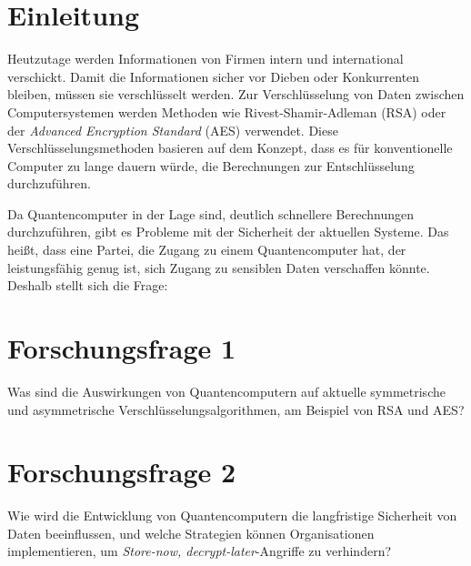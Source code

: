 \section{Einleitung}

Heutzutage werden Informationen von Firmen intern und international verschickt. 
Damit die Informationen sicher vor Dieben oder Konkurrenten bleiben, müssen sie verschlüsselt werden. 
Zur Verschlüsselung von Daten zwischen Computersystemen werden Methoden wie Rivest-Shamir-Adleman (RSA) oder der \textit{Advanced Encryption Standard} (AES) verwendet. 
Diese Verschlüsselungsmethoden basieren auf dem Konzept, dass es für konventionelle Computer zu lange dauern würde, die Berechnungen zur Entschlüsselung durchzuführen.

Da Quantencomputer in der Lage sind, deutlich schnellere Berechnungen durchzuführen, gibt es Probleme mit der Sicherheit der aktuellen Systeme. 
Das heißt, dass eine Partei, die Zugang zu einem Quantencomputer hat, der leistungsfähig genug ist, sich Zugang zu sensiblen Daten verschaffen könnte. Deshalb stellt sich die Frage:

\section*{Forschungsfrage 1}
Was sind die Auswirkungen von Quantencomputern auf aktuelle symmetrische und asymmetrische Verschlüsselungsalgorithmen, am Beispiel von RSA und AES?

\section*{Forschungsfrage 2}
Wie wird die Entwicklung von Quantencomputern die langfristige Sicherheit von Daten beeinflussen, und welche Strategien können Organisationen implementieren, um \textit{Store-now, decrypt-later}-Angriffe zu verhindern?
